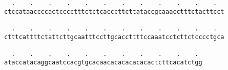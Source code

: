 \documentclass{article}
\begin{document}
\begin{Verbatim}
  .    .    .    .    .    .    .    .    .    .    .    .  
ctccataaccccactcccctttctctcacccttcttataccgcaaacctttctacttcct
                                                            
  .    .    .    .    .    .    .    .    .    .    .    .  
ctttcattttctattcttgcaatttccttgcaccttttccaaatcctcttctcccctgca
                                                            
  .    .    .    .    .    .    .    .    .    .    . 
ataccatacaggcaatccacgtgcacaacacacacacacactcttcacatctgg
                                                      
                                                      
\end{Verbatim}
\end{document}

